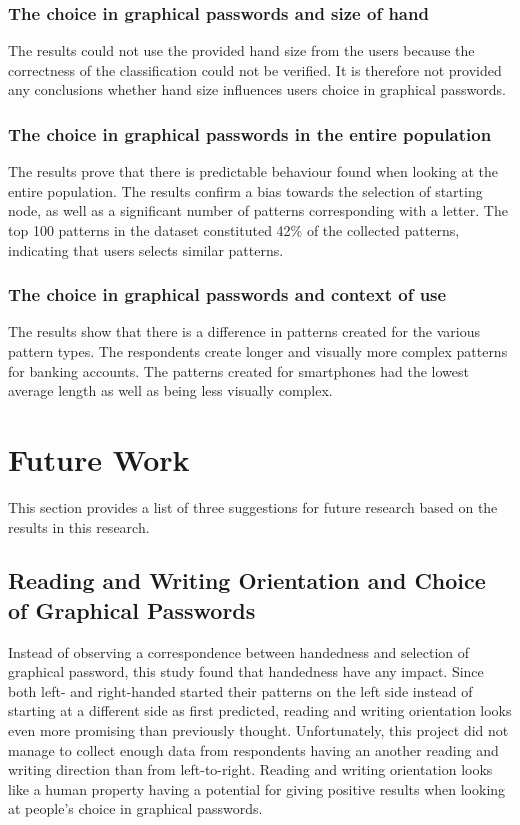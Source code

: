 \subsubsection*{The choice in graphical passwords and size of hand}
The results could not use the provided hand size from the users because the correctness of the classification could not be verified. It is therefore not provided any conclusions whether hand size influences users choice in graphical passwords. 

\subsubsection*{The choice in graphical passwords in the entire population}
The results prove that there is predictable behaviour found when looking at the entire population. The results confirm a bias towards the selection of starting node, as well as a significant number of patterns corresponding with a letter. The top 100 patterns in the dataset constituted 42\% of the collected patterns, indicating that users selects similar patterns. 

\subsubsection*{The choice in graphical passwords and context of use}
The results show that there is a difference in patterns created for the various pattern types. The respondents create longer and visually more complex patterns for banking accounts. The patterns created for smartphones had the lowest average length as well as being less visually complex.

  \clearpage
  \section{Future Work}\label{sec:futureWork}

    This section provides a list of three suggestions for future research based on the results in this research.

    \subsection{Reading and Writing Orientation and Choice of Graphical Passwords}
      Instead of observing a correspondence between handedness and selection of graphical password, this study found that handedness have any impact. Since both left- and right-handed started their patterns on the left side instead of starting at a different side as first predicted, reading and writing orientation looks even more promising than previously thought. Unfortunately, this project did not manage to collect enough data from respondents having an another reading and writing direction than from left-to-right. Reading and writing orientation looks like a human property having a potential for giving positive results when looking at people's choice in graphical passwords. 

